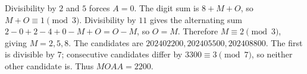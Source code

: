 Divisibility by $2$ and $5$ forces $A=0$. The digit sum is $8+M+O$, so $M+O\equiv1\pmod3$. Divisibility by $11$ gives the alternating sum $2-0+2-4+0-M+O=O-M$, so $O=M$. Therefore $M\equiv2\pmod3$, giving $M=2,5,8$. The candidates are $202402200,202405500,202408800$. The first is divisible by $7$; consecutive candidates differ by $3300\equiv3\pmod7$, so neither other candidate is. Thus $\boxed{MOAA=2200}$.
